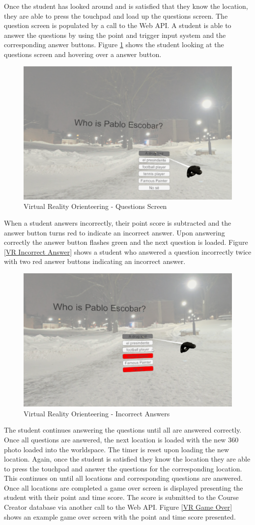 Once the student has looked around and is satisfied that they know the location, they are able to press the touchpad and load up the questions screen. The question screen is populated by a call to the Web API. A student is able to answer the questions by using the point and trigger input system and the corresponding answer buttons. Figure \ref{VR Question} shows the student looking at the questions screen and hovering over a answer button. 
\begin{figure}[htb]
	\centering
	\includegraphics[width=.5\textwidth]{Requirements/assets/vr-view-questions.png}
	\caption[Virtual Reality Orienteering - Questions Screen]{\label{VR Question}Virtual Reality Orienteering - Questions Screen}
\end{figure}
When a student answers incorrectly, their point score is subtracted and the answer button turns red to indicate an incorrect answer. Upon answering correctly the answer button flashes green and the next question is loaded. Figure \ref{VR Incorrect Answer} shows a student who answered a question incorrectly twice with two red answer buttons indicating an incorrect answer.
\begin{figure}[htb]
	\centering
	\includegraphics[width=.5\textwidth]{Requirements/assets/vr-answer-incorrectly.png}
	\caption[Virtual Reality Orienteering - Incorrect Answers]{\label{VR Incorrect Answers}Virtual Reality Orienteering - Incorrect Answers}
\end{figure}
The student continues answering the questions until all are answered correctly. Once all questions are answered, the next location is loaded with the new 360 photo loaded into the worldspace. The timer is reset upon loading the new location. Again, once the student is satisfied they know the location they are able to press the touchpad and answer the questions for the corresponding location. This continues on until all locations and corresponding questions are answered. Once all locations are completed a game over screen is displayed presenting the student with their point and time score. The score is submitted to the Course Creator database via another call to the Web API. Figure \ref{VR Game Over} shows an example game over screen with the point and time score presented. 
